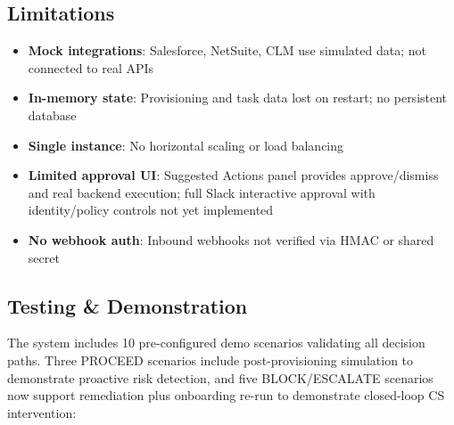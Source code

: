 \documentclass[8pt,a4paper]{article}
\begin{document}
\hfill
\begin{minipage}[t]{0.32\textwidth}
{\scriptsize
\subsection{Limitations}
{\scriptsize
\vspace{6pt}
\begin{itemize}
\item \textbf{Mock integrations}: Salesforce, NetSuite, CLM use simulated data; not connected to real APIs
\item \textbf{In-memory state}: Provisioning and task data lost on restart; no persistent database
\item \textbf{Single instance}: No horizontal scaling or load balancing
\item \textbf{Limited approval UI}: Suggested Actions panel provides approve/dismiss and real backend execution; full Slack interactive approval with identity/policy controls not yet implemented
\item \textbf{No webhook auth}: Inbound webhooks not verified via HMAC or shared secret
\end{itemize}
}
}
\end{minipage}

\vspace{0.05em}
\subsection{Testing \& Demonstration}
{\scriptsize
The system includes 10 pre-configured demo scenarios validating all decision paths. Three PROCEED scenarios include post-provisioning simulation to demonstrate proactive risk detection, and five BLOCK/ESCALATE scenarios now support remediation plus onboarding re-run to demonstrate closed-loop CS intervention:
}
\end{document}
